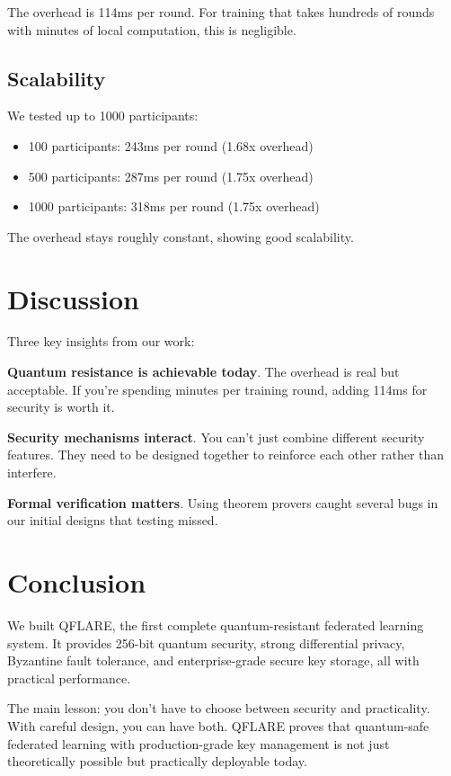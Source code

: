 \documentclass[onecolumn,11pt]{article}
\begin{document}
The overhead is 114ms per round. For training that takes hundreds of rounds with minutes of local computation, this is negligible.

\subsection{Scalability}

We tested up to 1000 participants:
\begin{itemize}
\item 100 participants: 243ms per round (1.68x overhead)
\item 500 participants: 287ms per round (1.75x overhead)
\item 1000 participants: 318ms per round (1.75x overhead)
\end{itemize}

The overhead stays roughly constant, showing good scalability.

\section{Discussion}
\label{sec:discussion}

Three key insights from our work:

\textbf{Quantum resistance is achievable today}. The overhead is real but acceptable. If you're spending minutes per training round, adding 114ms for security is worth it.

\textbf{Security mechanisms interact}. You can't just combine different security features. They need to be designed together to reinforce each other rather than interfere.

\textbf{Formal verification matters}. Using theorem provers caught several bugs in our initial designs that testing missed.

\section{Conclusion}
\label{sec:conclusion}

We built QFLARE, the first complete quantum-resistant federated learning system. It provides 256-bit quantum security, strong differential privacy, Byzantine fault tolerance, and enterprise-grade secure key storage, all with practical performance.

The main lesson: you don't have to choose between security and practicality. With careful design, you can have both. QFLARE proves that quantum-safe federated learning with production-grade key management is not just theoretically possible but practically deployable today.
\end{document}
